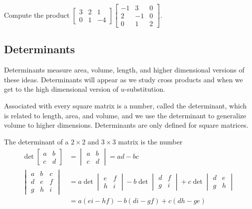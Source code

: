 \begin{problem} Compute the product
$\begin{bmatrix}
3 & 2& 1\\
0 & 1& -4
\end{bmatrix}
\begin{bmatrix}
-1&3 &0 \\
 2&-1 &0\\
 0&1 &2
\end{bmatrix}$.
\end{problem}


\subsection{Determinants}



Determinants measure area, volume, length, and higher dimensional versions of these ideas.  Determinants will appear as we study cross products and when we get to the high dimensional version of {$u$}-substitution.


Associated with every square matrix is a number, called the determinant, which is related to length, area, and volume, and we use the determinant to generalize volume to higher dimensions. Determinants are only defined for square matrices.
\begin{definition}
The determinant of a {$2\times 2$} and {$3\times 3$} matrix is the number 
\begin{align*}
\det\begin{bmatrix}a&b\\c&d\end{bmatrix} &=\begin{vmatrix}a&b\\c&d\end{vmatrix} = ad-bc\\
\begin{vmatrix}a&b&c\\d&e&f\\g&h&i\end{vmatrix} &= a\det\begin{vmatrix}e&f\\h&i\end{vmatrix} -b\det\begin{vmatrix}d&f\\g&i\end{vmatrix} +c\det\begin{vmatrix}d&e\\g&h\end{vmatrix}\\
&=a(ei-hf)-b(di-gf)+c(dh-ge)
\end{align*}
\end{definition}

